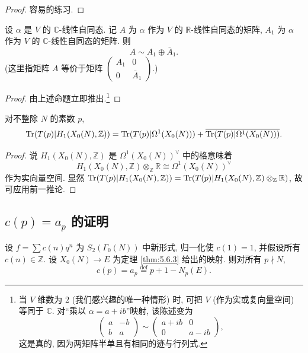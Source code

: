 \begin{proof}
容易的练习.
\end{proof}

\begin{corollary} \label{thm:5.7.8} 
设 $\alpha$ 是 $V$ 的 $\mathbb{C}$-线性自同态. 记 $A$ 为 $\alpha$ 作为 $V$ 的 $\mathbb{R}$-线性自同态的矩阵, $A_1$ 为 $\alpha$ 作为 $V$ 的 $\mathbb{C}$-线性自同态的矩阵. 则
\[
A\sim A_1\oplus\bar{A}_1.
\]
(这里指矩阵 $A$ 等价于矩阵 $\begin{pmatrix}A_1 & 0\\ 0 & \bar{A}_1\end{pmatrix}$.)
\end{corollary}

\begin{proof}
由上述命题立即推出.\footnote{当 $V$ 维数为 $2$ (我们感兴趣的唯一种情形) 时, 可把 $V$ (作为实或复向量空间) 等同于 $\mathbb{C}$. 对``乘以 $\alpha = a + ib$''映射, 该陈述变为
\[
\begin{pmatrix}a & -b\\ b & a\end{pmatrix}\sim\begin{pmatrix}a+ib & 0\\ 0 & a-ib\end{pmatrix},
\]
这是真的, 因为两矩阵半单且有相同的迹与行列式.}
\end{proof}

\begin{corollary} \label{thm:5.7.9} 
对不整除 $N$ 的素数 $p$,
\[
\operatorname{Tr}(T(p)|H_1(X_0(N), \mathbb{Z})) = \operatorname{Tr}(T(p)|\Omega^1(X_0(N))) + \overline{\operatorname{Tr}(T(p)|\Omega^1(X_0(N)))}.
\]
\end{corollary}

\begin{proof}
说 $H_1(X_0(N), \mathbb{Z})$ 是 $\Omega^1(X_0(N))^{\vee}$ 中的格意味着
\[
H_1(X_0(N), \mathbb{Z})\otimes_{\mathbb{Z}}\mathbb{R}\cong\Omega^1(X_0(N))^{\vee}
\]
作为实向量空间. 显然 $\operatorname{Tr}(T(p)|H_1(X_0(N), \mathbb{Z})) = \operatorname{Tr}(T(p)|H_1(X_0(N), \mathbb{Z})\otimes_{\mathbb{Z}}\mathbb{R})$, 故可应用前一推论.
\end{proof}

\subsection*{$c(p) = a_p$ 的证明}

\begin{theorem} \label{thm:5.7.10} 
设 $f = \sum c(n)q^n$ 为 $S_2(\Gamma_0(N))$ 中新形式, 归一化使 $c(1) = 1$, 并假设所有 $c(n)\in\mathbb{Z}$. 设 $X_0(N)\to E$ 为定理 \ref{thm:5.6.3} 给出的映射. 则对所有 $p\nmid N$,
\[
c(p) = a_p \overset{\text{def}}{=} p + 1 - N_p(E).
\]
\end{theorem}


